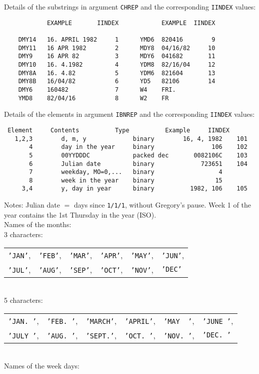\newpage
Details of the substrings in argument {\tt CHREP} and the
corresponding {\tt IINDEX} values:
\begin{verbatim}
            EXAMPLE       IINDEX            EXAMPLE  IINDEX
 
    DMY14   16. APRIL 1982     1      YMD6  820416        9
    DMY11   16 APR 1982        2      MDY8  04/16/82     10
    DMY9    16 APR 82          3      MDY6  041682       11
    DMY10   16. 4.1982         4      YDM8  82/16/04     12
    DMY8A   16. 4.82           5      YDM6  821604       13
    DMY8B   16/04/82           6      YD5   82106        14
    DMY6    160482             7      W4    FRI.
    YMD8    82/04/16           8      W2    FR
\end{verbatim}
Details of the elements in argument {\tt IBNREP} and the
corresponding {\tt IINDEX} values:
\begin{verbatim}
 Element     Contents          Type          Example     IINDEX
   1,2,3        d, m, y             binary        16, 4, 1982    101
       4        day in the year     binary                106    102
       5        00YYDDDC            packed dec       0082106C    103
       6        Julian date         binary             723651    104
       7        weekday, MO=0,...   binary                  4
       8        week in the year    binary                 15
     3,4        y, day in year      binary          1982, 106    105
\end{verbatim}
Notes: Julian date $=$ days since {\tt 1/1/1}, without Gregory's pause.
Week 1 of the year contains the 1st Thursday in the year (ISO). \\[2mm]
Names of the months: \\[1mm]
3 characters:
\begin{tabular}[t]{llllll}
{\tt 'JAN'}, & {\tt 'FEB'}, & {\tt 'MAR'}, & {\tt 'APR'}, &
{\tt 'MAY'}, & {\tt 'JUN'}, \\
{\tt 'JUL'}, & {\tt 'AUG'}, & {\tt 'SEP'}, & {\tt 'OCT'}, &
{\tt 'NOV'}, & {\tt 'DEC'}
\end{tabular} \\[1mm]
5 characters:
\begin{tabular}[t]{llllll}
{\tt 'JAN.\ '}, & {\tt 'FEB.\ '}, & {\tt 'MARCH'}, & {\tt 'APRIL'}, &
{\tt 'MAY\ \ '},& {\tt 'JUNE\ '}, \\
{\tt 'JULY\ '}, & {\tt 'AUG.\ '}, & {\tt 'SEPT.'}, & {\tt 'OCT.\ '},&
{\tt 'NOV.\ '}, & {\tt 'DEC.\ '}
\end{tabular} \\[2mm]
Names of the week days: \\[1mm]
